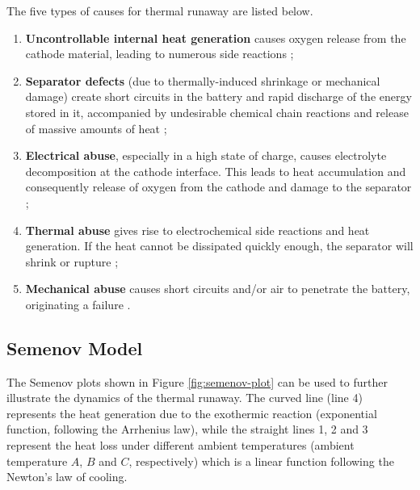The five types of causes for thermal runaway are listed below.
\begin{enumerate}
    \item \textbf{Uncontrollable internal heat generation} causes oxygen release from the cathode material, leading to numerous side reactions \cite{jung2017oxygen};
    \item \textbf{Separator defects} (due to thermally-induced shrinkage or mechanical damage) create short circuits in the battery and rapid discharge of the energy stored in it, accompanied by undesirable chemical chain reactions and release of massive amounts of heat \cite{wang2015alumina};
    \item \textbf{Electrical abuse}, especially in a high state of charge, causes electrolyte decomposition at the cathode interface. This leads to heat accumulation and consequently release of oxygen from the cathode and damage to the separator \cite{ren2017electrochemical};
    \item \textbf{Thermal abuse} gives rise to electrochemical side reactions and heat generation. If the heat cannot be dissipated quickly enough, the separator will shrink or rupture \cite{tarascon2001issues,kim2014shape};
    \item \textbf{Mechanical abuse} causes short circuits and/or air to penetrate the battery, originating a failure \cite{liu2020safety}.
\end{enumerate}

\subsection{Semenov Model}
\label{sec:semenov-model}
The Semenov plots \cite{semenov2013some} shown in Figure \ref{fig:semenov-plot} can be used to further illustrate the dynamics of the thermal runaway. The curved line (line 4) represents the heat generation due to the exothermic reaction (exponential function, following the Arrhenius law), while the straight lines 1, 2 and 3 represent the heat loss under different ambient temperatures (ambient temperature $A$, $B$ and $C$, respectively) which is a linear function following the Newton's law of cooling. 

